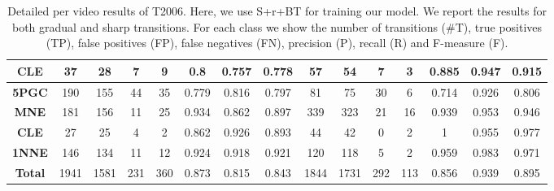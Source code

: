 \documentclass[journal]{IEEEtran}
\begin{document}
\begin{table*}[h]
\begin{tabular}{|c|c|c|c|c|c|c|c|c|c|c|c|c|c|c|}
\textbf{CLE}       & 37            & 28          & 7           & 9           & 0.8        & 0.757      & 0.778      & 57            & 54          & 7           & 3           & 0.885      & 0.947      & 0.915      \\ \hline
\textbf{5PGC} & 190           & 155         & 44          & 35          & 0.779      & 0.816      & 0.797      & 81            & 75          & 30          & 6           & 0.714      & 0.926      & 0.806      \\ \hline
\textbf{MNE}     & 181           & 156         & 11          & 25          & 0.934      & 0.862      & 0.897      & 339           & 323         & 21          & 16          & 0.939      & 0.953      & 0.946      \\ \hline
\textbf{CLE}       & 27            & 25          & 4           & 2           & 0.862      & 0.926      & 0.893      & 44            & 42          & 0           & 2           & 1          & 0.955      & 0.977      \\ \hline
\textbf{1NNE}    & 146           & 134         & 11          & 12          & 0.924      & 0.918      & 0.921      & 120           & 118         & 5           & 2           & 0.959      & 0.983      & 0.971      \\ \hline
\textbf{Total}                     & 1941          & 1581        & 231         & 360         & 0.873      & 0.815      & 0.843      & 1844          & 1731        & 292         & 113         & 0.856      & 0.939      & 0.895      \\ \hline
\end{tabular}
\caption{Detailed per video results of T2006. Here, we use S+r+BT for training our model. We report the results for both gradual and sharp transitions. For each class we show the number of transitions (\#T), true positives (TP), false positives (FP), false negatives (FN), precision (P), recall (R) and F-measure (F).}
\label{2006_08}
\end{table*}
\end{document}
